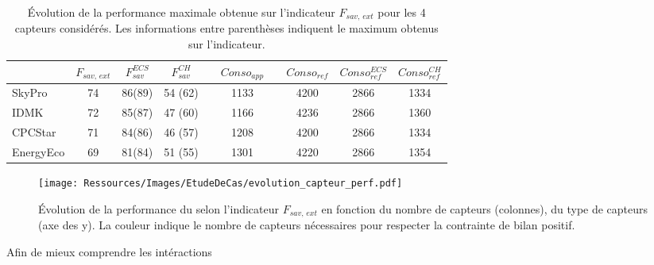 \begin{table}
\centering
\caption[Performance maximale pouvant être obtenue pour les différents capteurs solaires]
         {Évolution de la performance maximale obtenue sur l’indicateur
          $F_{sav,\, ext}$ pour les \num{4} capteurs considérés. Les informations entre
          parenthèses indiquent le maximum obtenus sur l’indicateur.}
\label{tab:capteur_perf_variation}
\begin{tabular}{l c c c c c c c c c}
    \toprule
              & $F_{sav,\,ext}$ & $F_{sav}^{ECS}$ & $F_{sav}^{CH}$ & &  $Conso_{app}$ & & $Conso_{ref}$ & $Conso_{ref}^{ECS}$ & $Conso_{ref}^{CH}$ \\
    \midrule
    SkyPro    & \num{74} & \num{86}(\num{89}) & \num{54} (\num{62}) & & \num{1133} & & \num{4200} & \num{2866} & \num{1334} \\
    IDMK      & \num{72} & \num{85}(\num{87}) & \num{47} (\num{60}) & & \num{1166} & & \num{4236} & \num{2866} & \num{1360} \\
    CPCStar   & \num{71} & \num{84}(\num{86}) & \num{46} (\num{57}) & & \num{1208} & & \num{4200} & \num{2866} & \num{1334} \\
    EnergyEco & \num{69} & \num{81}(\num{84}) & \num{51} (\num{55}) & & \num{1301} & & \num{4220} & \num{2866} & \num{1354} \\
    \bottomrule
\end{tabular}
\end{table}


\begin{figure}
    \centering
    \texttt{[image: Ressources/Images/EtudeDeCas/evolution\_capteur\_perf.pdf]}
    \caption[Occurrences de chaque type de capteurs pour les solutions du front de Pareto]
             {Évolution de la performance du  selon l’indicateur $F_{sav,\,ext}$
              en fonction du nombre de capteurs (colonnes), du type de capteurs (axe des y).
              La couleur indique le nombre de capteurs  nécessaires pour respecter
              la contrainte de bilan positif.}
    \label{fig:occurence_type_capteur}
\end{figure}


Afin de mieux comprendre les intéractions




